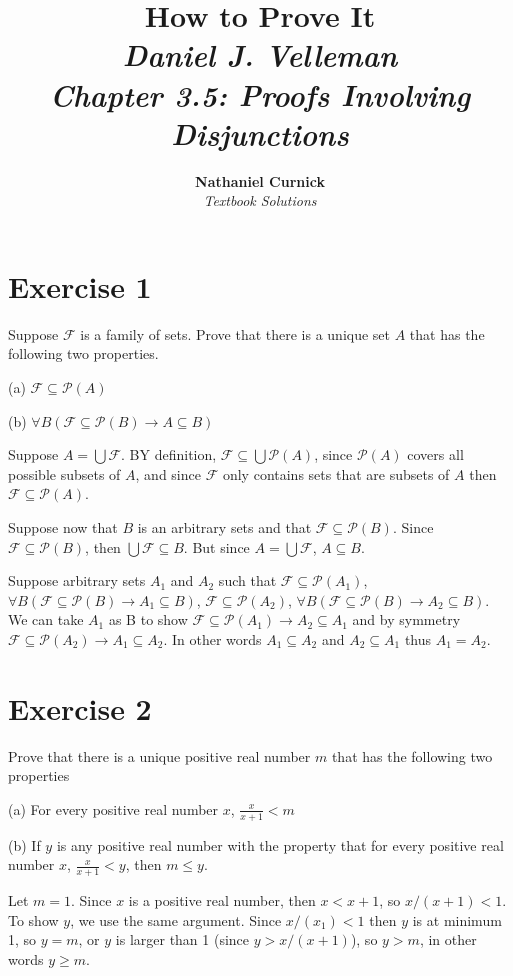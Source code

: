 \documentclass[11pt]{article}
\title{\textbf{How to Prove It} \\ {\Large\itshape Daniel J. Velleman} \\ {\Large\itshape Chapter 3.5: Proofs Involving Disjunctions}}
\author{\textbf{Nathaniel Curnick} \\ \textit{Textbook Solutions}}
\date{}
\newcommand{\then}{\rightarrow}
\newcommand{\powerset}[1]{\mathscr{P}(#1)}
\newcommand{\family}[1]{\mathcal{#1}}
\begin{document}
\maketitle

\section*{Exercise 1}

Suppose $\family{F}$ is a family of sets. Prove that there is a unique set 
$A$ that has the following two properties.

\noindent (a) $\family{F} \subseteq \powerset{A}$

\noindent (b) $\forall B (\family{F} \subseteq \powerset{B} \then A \subseteq B)$

Suppose $A = \bigcup \family{F}$. BY definition, 
$\family{F} \subseteq \bigcup \powerset{A}$, since $\powerset{A}$ covers all 
possible subsets of $A$, and since $\family{F}$ only contains sets that are 
subsets of $A$ then $\family{F} \subseteq \powerset{A}$.

Suppose now that $B$ is an arbitrary sets and that 
$\family{F} \subseteq \powerset{B}$. Since $\family{F} \subseteq \powerset{B}$,
then $\bigcup \family{F} \subseteq B$. But since $A = \bigcup \family{F}$,
$A \subseteq B$.

Suppose arbitrary sets $A_1$ and $A_2$ such that 
$\family{F} \subseteq \powerset{A_1}$,
$\forall B (\family{F} \subseteq \powerset{B} \then A_1 \subseteq B)$,
$\family{F} \subseteq \powerset{A_2}$,
$\forall B (\family{F} \subseteq \powerset{B} \then A_2 \subseteq B)$.
We can take $A_1$ as B to show 
$\family{F} \subseteq \powerset{A_1} \then A_2 \subseteq A_1$ and by symmetry
$\family{F} \subseteq \powerset{A_2} \then A_1 \subseteq A_2$.
In other words $A_1 \subseteq A_2$ and $A_2 \subseteq A_1$ thus 
$A_1 = A_2$.

\section*{Exercise 2}

Prove that there is a unique positive real number $m$ that has the following 
two properties

\noindent (a) For every positive real number $x$, $\frac{x}{x+1} < m$

\noindent (b) If $y$ is any positive real number with the property that for every 
positive real number $x$, $\frac{x}{x+1} < y$, then $m \leq y$.

Let $m=1$. Since $x$ is a positive real number, then $x < x + 1$, so 
$x / (x+1) < 1$. To show $y$, we use the same argument. Since $x/(x_1) < 1$ then 
$y$ is at minimum 1, so $y = m$, or $y$ is larger than 1 (since 
$y > x / (x+1)$), so $y>m$, in other words $y \geq m$.
\end{document}
